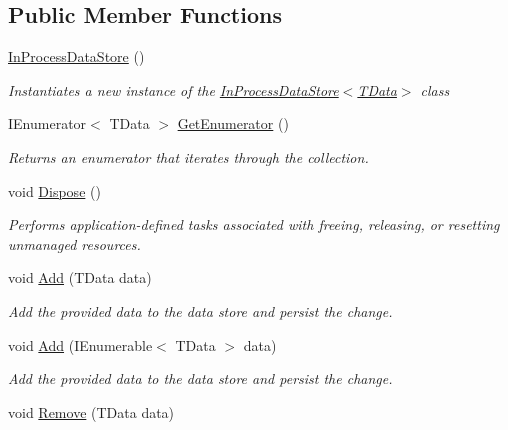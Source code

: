 \subsection*{Public Member Functions}
\begin{DoxyCompactItemize}
\item 
\hyperlink{classCqrs_1_1DataStores_1_1InProcessDataStore_a86a0ef4945e0f2fa45027ceb3261d284}{In\+Process\+Data\+Store} ()
\begin{DoxyCompactList}\small\item\em Instantiates a new instance of the \hyperlink{classCqrs_1_1DataStores_1_1InProcessDataStore_a86a0ef4945e0f2fa45027ceb3261d284}{In\+Process\+Data\+Store$<$\+T\+Data$>$} class \end{DoxyCompactList}\item 
I\+Enumerator$<$ T\+Data $>$ \hyperlink{classCqrs_1_1DataStores_1_1InProcessDataStore_a867c2badec9f0669cf70257f5572b701}{Get\+Enumerator} ()
\begin{DoxyCompactList}\small\item\em Returns an enumerator that iterates through the collection. \end{DoxyCompactList}\item 
void \hyperlink{classCqrs_1_1DataStores_1_1InProcessDataStore_a220126a1dd0e318197b9c994c313d5fd}{Dispose} ()
\begin{DoxyCompactList}\small\item\em Performs application-\/defined tasks associated with freeing, releasing, or resetting unmanaged resources. \end{DoxyCompactList}\item 
void \hyperlink{classCqrs_1_1DataStores_1_1InProcessDataStore_ade5c4033c628598665c0cba986a54c15}{Add} (T\+Data data)
\begin{DoxyCompactList}\small\item\em Add the provided {\itshape data}  to the data store and persist the change. \end{DoxyCompactList}\item 
void \hyperlink{classCqrs_1_1DataStores_1_1InProcessDataStore_ad62504e478f0a907c18ec4aa9b42703a}{Add} (I\+Enumerable$<$ T\+Data $>$ data)
\begin{DoxyCompactList}\small\item\em Add the provided {\itshape data}  to the data store and persist the change. \end{DoxyCompactList}\item 
void \hyperlink{classCqrs_1_1DataStores_1_1InProcessDataStore_a43a93c614a403181e0641106ca9509d6}{Remove} (T\+Data data)

\end{DoxyCompactItemize}
